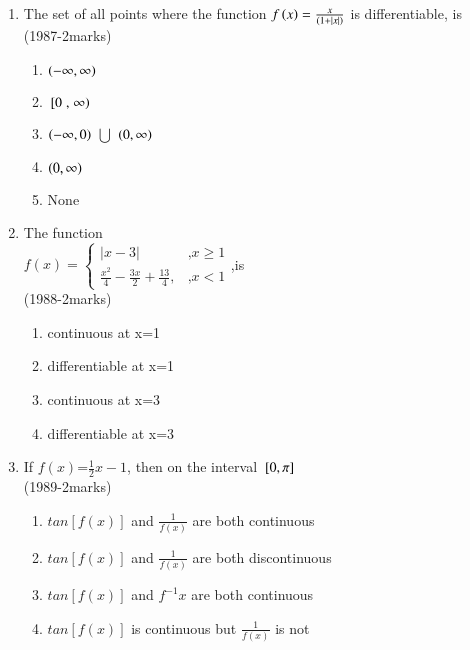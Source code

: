 \documentclass[journal,12pt,twocolumn]{IEEEtran}
\theoremstyle{remark}
\begin{document}
\begin{enumerate}
\item The set of all points where the function $f\left(x\right)=\frac{x}{(1+|x|)}$ is differentiable, is \\
\hfill{(1987-2marks)} 

\begin{enumerate}
	\item $\left(- \infty, \infty\right)$
	\item ${}\left[0\right., \left.\infty\right)$
	\item $\left(- \infty,0\right)$ $\bigcup$ $\left(0, \infty\right)$
	\item $\left(0, \infty\right)$
    \item None \\
\end{enumerate}
\item The function \\ $f(x)=\begin{cases}|x-3| & \text{,} x \geq 1 \\
    \frac{x^2}{4}-\frac{3x}{2}+\frac{13}{4}, & \text{,} x<1 
\end{cases}$,is \\ \hfill{(1988-2marks)} 
\begin{enumerate}
    \item continuous at x=1
    \item differentiable at x=1
    \item continuous at x=3
    \item differentiable at x=3 \\ 
\end{enumerate}
\item If $f(x)$=$\frac{1}{2}x-1$, then on the interval ${}\left[0,\pi\right]$ \\ \hfill{(1989-2marks)} 
\begin{enumerate}
    \item $tan[f(x)]$ and $\frac{1}{f(x)}$ are both continuous
    \item $tan[f(x)]$ and $\frac{1}{f(x)}$ are both discontinuous
    \item $tan[f(x)]$ and $f^{-1}x$ are both continuous
    \item $tan[f(x)]$ is continuous but $\frac{1}{f(x)}$ is not \\
\end{enumerate}


\end{enumerate}
\end{document}
